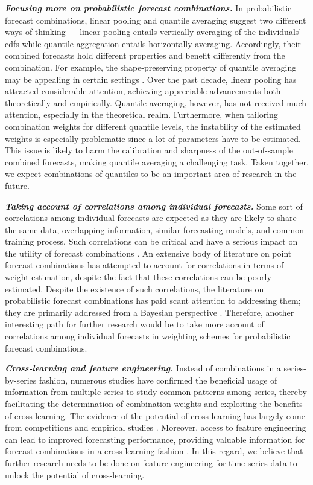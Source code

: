 \documentclass[a4paper,11pt]{article}
\begin{document}
\textbf{\textit{Focusing more on probabilistic forecast combinations.}} In probabilistic forecast combinations, linear pooling and quantile averaging suggest two different ways of thinking --- linear pooling entails vertically averaging of the individuals' cdfs while quantile aggregation entails horizontally averaging. Accordingly, their combined forecasts hold different properties and benefit differently from the combination. For example, the shape-preserving property of quantile averaging may be appealing in certain settings \citep{Lichtendahl2013-rt}. Over the past decade, linear pooling has attracted considerable attention, achieving appreciable advancements both theoretically and empirically. Quantile averaging, however, has not received much attention, especially in the theoretical realm. Furthermore, when tailoring combination weights for different quantile levels, the instability of the estimated weights is especially problematic since a lot of parameters have to be estimated. This issue is likely to harm the calibration and sharpness of the out-of-sample combined forecasts, making quantile averaging a challenging task. Taken together, we expect combinations of quantiles to be an important area of research in the future.

\textbf{\textit{Taking account of correlations among individual forecasts.}} Some sort of correlations among individual forecasts are expected as they are likely to share the same data, overlapping information, similar forecasting models, and common training process. Such correlations can be critical and have a serious impact on the utility of forecast combinations \citep{De_Menezes2000-vd}. An extensive body of literature on point forecast combinations has attempted to account for correlations in terms of weight estimation, despite the fact that these correlations can be poorly estimated. Despite the existence of such correlations, the literature on probabilistic forecast combinations has paid scant attention to addressing them; they are primarily addressed from a Bayesian perspective \citep[e.g.,][]{Winkler1981-bn,McAlinn2019-kn}. Therefore, another interesting path for further research would be to take more account of correlations among individual forecasts in weighting schemes for probabilistic forecast combinations.

\textbf{\textit{Cross-learning and feature engineering.}} Instead of combinations in a series-by-series fashion, numerous studies have confirmed the beneficial usage of information from multiple series to study common patterns among series, thereby facilitating the determination of combination weights and exploiting the benefits of cross-learning. The evidence of the potential of cross-learning has largely come from competitions \citep[e.g.,][]{Makridakis2020-hu,Makridakis2020-fn} and empirical studies \citep[e.g.,][]{Ma2021-np}. Moreover, access to feature engineering can lead to improved forecasting performance, providing valuable information for forecast combinations in a cross-learning fashion \citep{Montero-Manso2020-tq,Kang2021-ol}. In this regard, we believe that further research needs to be done on feature engineering for time series data to unlock the potential of cross-learning.
\end{document}
